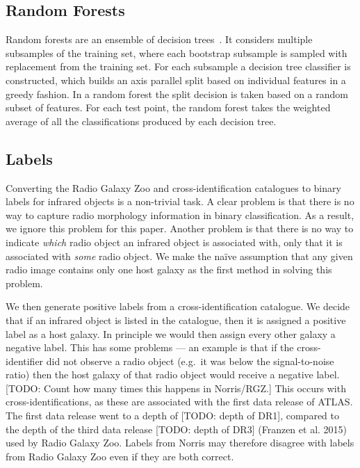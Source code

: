 \documentclass[fleqn,usenatbib,usedcolumn]{mnras}
\begin{document}
  \subsection{Random Forests}\label{random-forests}

    Random forests are an ensemble of decision trees~\citep{breiman01random-forest}.
    It considers multiple subsamples
    of the training set, where each bootstrap subsample is sampled with replacement
    from the training set. For each subsample a decision tree classifier is constructed,
    which builds an axis parallel split based on individual features in a greedy fashion.
    In a random forest the split decision is taken based on a random subset of features.
    For each test point, the random forest takes the weighted average of all the
    classifications produced by each decision tree.

  \subsection{Labels}\label{labels}

    Converting the Radio Galaxy Zoo and \citet{norris06} cross-identification
    catalogues to binary labels for infrared objects is a non-trivial task. A
    clear problem is that there is no way to capture radio morphology
    information in binary classification. As a result, we ignore this problem
    for this paper. Another problem is that there is no way to indicate
    \emph{which} radio object an infrared object is associated with, only that
    it is associated with \emph{some} radio object. We make the na\"ive
    assumption that any given radio image contains only one host galaxy as the
    first method in solving this problem.

    We then generate positive labels from a cross-identification catalogue.
    We decide that if an infrared object is listed in the catalogue, then it
    is assigned a positive label as a host galaxy. In principle we would
    then assign every other galaxy a negative label. This has some problems
    --- an example is that if the cross-identifier did not observe a radio
    object (e.g.~it was below the signal-to-noise ratio) then the host
    galaxy of that radio object would receive a negative label. {[}TODO:
    Count how many times this happens in Norris/RGZ.{]} This occurs with
    \citet{norris06} cross-identifications, as these are associated with
    the first data release of ATLAS. The first data release went to a depth
    of {[}TODO: depth of DR1{]}, compared to the depth of the third data
    release {[}TODO: depth of DR3{]} (Franzen et al. 2015) used by Radio
    Galaxy Zoo. Labels from Norris may therefore disagree with labels from
    Radio Galaxy Zoo even if they are both correct.
\end{document}
